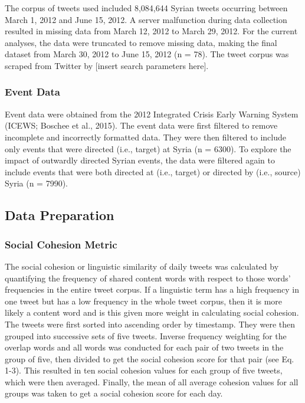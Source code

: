 \documentclass[english,man]{apa6}
\begin{document}
The corpus of tweets used included 8,084,644 Syrian tweets occurring between March 1, 2012 and June 15, 2012. A server malfunction during data collection resulted in missing data from March 12, 2012 to March 29, 2012. For the current analyses, the data were truncated to remove missing data, making the final dataset from March 30, 2012 to June 15, 2012 (n = 78). The tweet corpus was scraped from Twitter by {[}insert search parameters here{]}.

\hypertarget{event-data}{%
\subsubsection{Event Data}\label{event-data}}

Event data were obtained from the 2012 Integrated Crisis Early Warning System (ICEWS; Boschee et al., 2015). The event data were first filtered to remove incomplete and incorrectly formatted data. They were then filtered to include only events that were directed (i.e., target) at Syria (n = 6300). To explore the impact of outwardly directed Syrian events, the data were filtered again to include events that were both directed at (i.e., target) or directed by (i.e., source) Syria (n = 7990).

\hypertarget{data-preparation}{%
\subsection{Data Preparation}\label{data-preparation}}

\hypertarget{social-cohesion-metric}{%
\subsubsection{Social Cohesion Metric}\label{social-cohesion-metric}}

The social cohesion or linguistic similarity of daily tweets was calculated by quantifying the frequency of shared content words with respect to those words' frequencies in the entire tweet corpus. If a linguistic term has a high frequency in one tweet but has a low frequency in the whole tweet corpus, then it is more likely a content word and is this given more weight in calculating social cohesion.
The tweets were first sorted into ascending order by timestamp. They were then grouped into successive sets of five tweets. Inverse frequency weighting for the overlap words and all words was conducted for each pair of two tweets in the group of five, then divided to get the social cohesion score for that pair (see Eq. 1-3). This resulted in ten social cohesion values for each group of five tweets, which were then averaged. Finally, the mean of all average cohesion values for all groups was taken to get a social cohesion score for each day.
\end{document}
